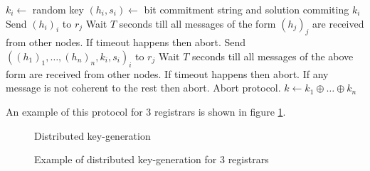 \begin{algorithm}[tb]
  \begin{algorithmic}[1]
  \STATE $k_i \leftarrow $ random key
  \STATE $(h_i, s_i) \leftarrow $ bit commitment string and solution commiting
  $k_i$
    \STATE Send $(h_i)_{i}$ to $r_j$
  \ENDFOR
  \STATE Wait $T$ seconds till all messages of the form $(h_j)_j$ are received
  from other nodes. If timeout happens then abort.
    \STATE Send $\left( (h_1)_1, \ldots, (h_n)_{n}, k_i, s_i\right)_i$ to $r_j$
  \ENDFOR
  \STATE Wait $T$ seconds till all messages of the above form are received
  from other nodes. If timeout happens then abort. If any message is not
  coherent to the rest then abort.
      \STATE Abort protocol.
    \ENDIF
  \ENDFOR
  \STATE $k \leftarrow k_1 \oplus \ldots \oplus k_n$
\end{algorithmic}
  \caption{Distributed key generation algorithm generating random key $k$}
  \label{alg:key_gen_alg}
\end{algorithm}

An example of this protocol for 3 registrars is shown in figure
\ref{fig:key_gen_example}.

\begin{figure}
\begin{msc}{Distributed key-generation}
\setlength{\instdist}{5.5cm}
\setlength{\envinstdist}{3cm}
\nextlevel[5]
\nextlevel[2]
\nextlevel[2]
\nextlevel[2]
\nextlevel[2]
\nextlevel[2]
\nextlevel[2]
\nextlevel[2]
\nextlevel[2]
\nextlevel[2]
\nextlevel[4]
\end{msc}
\caption{Example of distributed key-generation for 3 registrars}
\label{fig:key_gen_example}
\end{figure}

